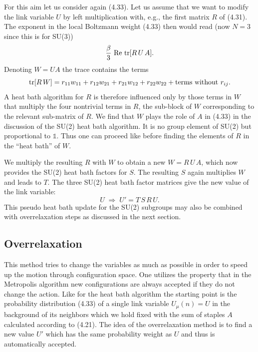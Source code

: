 For this aim let us consider again (4.33). Let us assume that we want to
modify the link variable $U$ by left multiplication with, e.g., the first matrix
$R$ of (4.31). The exponent in the local Boltzmann weight (4.33) then would
read (now $N = 3$ since this is for SU(3))
\begin{equation}
  \frac{\beta}{3}\,\operatorname{Re}\,\operatorname{tr}[R\,U\,A].
\end{equation}
Denoting $W = U A$ the trace contains the terms
\begin{equation}
  \operatorname{tr}[R\,W] = r_{11}w_{11} + r_{12}w_{21} + r_{21}w_{12} + r_{22}w_{22}
  + \text{terms without } r_{ij}.
\end{equation}
A heat bath algorithm for $R$ is therefore influenced only by those terms in $W$
that multiply the four nontrivial terms in $R$, the sub-block of $W$ corresponding
to the relevant sub-matrix of $R$. We find that $W$ plays the role of $A$ in (4.33)
in the discussion of the SU(2) heat bath algorithm. It is no group element
of SU(2) but proportional to $\mathbb{1}$. Thus one can proceed like before finding the
elements of $R$ in the ``heat bath'' of $W$.

We multiply the resulting $R$ with $W$ to obtain a new $W = R\,U\,A$, which
now provides the SU(2) heat bath factors for $S$. The resulting $S$ again multiplies $W$ and leads to $T$. The three SU(2) heat bath factor matrices give the
new value of the link variable:
\begin{equation}
  U \;\Rightarrow\; U' = T\,S\,R\,U .
\end{equation}
This pseudo heat bath update for the SU(2) subgroups may also be combined
with overrelaxation steps as discussed in the next section.

\subsection{Overrelaxation}

This method tries to change the variables as much as possible in order to
speed up the motion through configuration space. One utilizes the property
that in the Metropolis algorithm new configurations are always accepted if
they do not change the action. Like for the heat bath algorithm the starting
point is the probability distribution (4.33) of a single link variable $U_\mu(n) = U$
in the background of its neighbors which we hold fixed with the sum of staples
$A$ calculated according to (4.21). The idea of the overrelaxation method is to
find a new value $U'$ which has the same probability weight as $U$ and thus is
automatically accepted.

